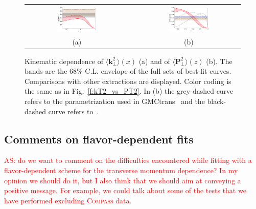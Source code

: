 \documentclass[aps,preprintnumbers,showpacs,nofootinbib,superscriptaddress,floatfix]{revtex4}
\newcommand{\compass}{\textsc{Compass }}
\newcommand{\T}{\perp}
\begin{document}
\begin{figure}[h!]
\centering
\begin{tabular}{ccc}
\includegraphics[width=0.40\textwidth]{plots/kT2av_Compare_with_other_extractions_flINDEP.pdf}
&\hspace{0.001cm}
&
\includegraphics[width=0.40\textwidth]{plots/PT2av_Compare_with_other_extractions_flINDEP.pdf}
\\
(a) && (b)
\end{tabular}
\caption{Kinematic dependence of $\big \langle \bm{k}_{\T}^2 \big \rangle (x)$ (a) and of $\big \langle \bm{P}_{\perp}^2 \big \rangle (z)$ (b). The bands are the $68\%$ C.L. envelope of the full sets of best-fit curves. Comparisons with other extractions are displayed. Color coding is the same as in Fig.~\ref{f:kT2_vs_PT2}.  In (b) the grey-dashed curve refers to the parametrization used in GMCtrans~\cite{gmctrans} and the black-dashed curve refers to~\cite{Boglione:1999pz}. }
\label{f:avmomenta_68CL}
\end{figure}






\subsection{Comments on flavor-dependent fits}
\label{ss:comment_fldep}

\textcolor{red}{AS: do we want to comment on the difficulties encountered while fitting with a flavor-dependent scheme for the transverse momentum dependence? In my opinion we should do it, but I also think that we should aim at conveying a positive message. For example, we could talk about some of the tests that we have performed excluding \compass data.}
\end{document}
